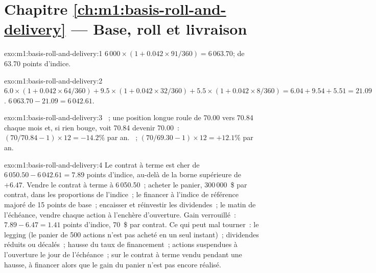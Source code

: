 \section*{Chapitre \ref{ch:m1:basis-roll-and-delivery} --- Base, roll et livraison}

\begin{solution}{exo:m1:basis-roll-and-delivery:1}
$6\,000 \times (1 + 0.042 \times 91/360) = 6\,063.70$;  de 63.70 points d'indice.
\end{solution}

\begin{solution}{exo:m1:basis-roll-and-delivery:2}
$6.0 \times (1 + 0.042 \times 64/360) + 9.5 \times (1 + 0.042 \times 32/360) + 5.5
\times (1 + 0.042 \times 8/360) = 6.04 + 9.54 + 5.51 = 21.09$. 
$6\,063.70 - 21.09 = 6\,042.61$.
\end{solution}

\begin{solution}{exo:m1:basis-roll-and-delivery:3}
~; une position longue roule de 70.00 vers 70.84 chaque mois et, si rien
bouge, voit 70.84 devenir 70.00~: $(70/70.84 - 1) \times 12 = -14.2\%$ par an.
~; $(70/69.30 - 1) \times 12 = +12.1\%$ par an.
\end{solution}

\begin{solution}{exo:m1:basis-roll-and-delivery:4}
Le contrat à terme est cher de $6\,050.50 - 6\,042.61 = 7.89$ points d'indice, au-delà de la
borne supérieure de $+6.47$. Vendre le contrat à terme à 6\,050.50~; acheter le panier, 300\,000~\$ par
contrat, dans les proportions de l'indice~; le financer à l'indice de référence majoré de 15
points de base~; encaisser et réinvestir les dividendes~; le matin de l'échéance, vendre chaque
action à l'enchère d'ouverture. Gain verrouillé~: $7.89 - 6.47 = 1.41$ points d'indice, 70~\$ par
contrat. Ce qui peut mal tourner~: le legging (le panier de 500 actions n'est pas acheté
en un seul instant)~; dividendes réduits ou décalés~; hausse du taux de financement~; actions
suspendues à l'ouverture le jour de l'échéance~;  sur le contrat à terme vendu
pendant une hausse, à financer alors que le gain du panier n'est pas encore réalisé.
\end{solution}

